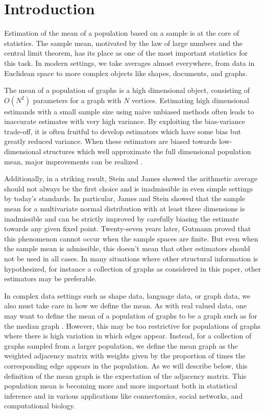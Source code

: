 \documentclass[10pt,letterpaper]{article}
\begin{document}
\section{Introduction}

Estimation of the mean of a population based on a sample is at the core of statistics.
The sample mean, motivated by the law of large numbers and the central limit theorem, has its place as one of the most important statistics for this task.
In modern settings, we take averages almost everywhere, from data in Euclidean space to more complex objects like shapes, documents, and graphs.

The mean of a population of graphs is a high dimensional object, consisting of $O(N^2)$ parameters for a graph with $N$ vertices.
Estimating high dimensional estimands with a small sample size using naive unbiased methods often leads to inaccurate estimates with very high variance.
By exploiting the bias-variance trade-off, it is often fruitful to develop estimators which have some bias but greatly reduced variance.
When these estimators are biased towards low-dimensional structures which well approximate the full dimensional population mean, major improvements can be realized \cite{trunk1979problem}.


Additionally, in a striking result, Stein and James \cite{stein1956inadmissibility,james1961estimation} showed the arithmetic average should not always be the first choice and is inadmissible in even simple settings by today's standards. 
In particular, James and Stein showed that the sample mean for a multivariate normal distribution with at least three dimensions is inadmissible and can be strictly improved by carefully biasing the  estimate towards any given fixed point. 
Twenty-seven years later, Gutmann \cite{gutmann1982stein} proved that this phenomenon cannot occur when the sample spaces are finite.
But even when  the sample mean is admissible, this doesn't mean that other estimators should not be used in all cases.
In many situations where other structural information is hypothesized, for instance a collection of graphs as considered in this paper, other estimators may be preferable.

In complex data settings such as shape data, language data, or graph data, we also must take care in how we define the mean.
As with real valued data, one may want to define the mean of a population of graphs to be a graph such as for the median graph \cite{jiang2001median}.
However, this may be too restrictive for populations of graphs where there is high variation in which edges appear. 
Instead, for a collection of graphs sampled from a larger population, we define the mean graph as the weighted adjacency matrix with weights given by the proportion of times the corresponding edge appears in the population. 
As we will describe below, this definition of the mean graph is the expectation of the adjacency matrix.
This population mean is becoming more and more important both in statistical inference and in various applications like connectomics, social networks, and computational biology.
\end{document}
